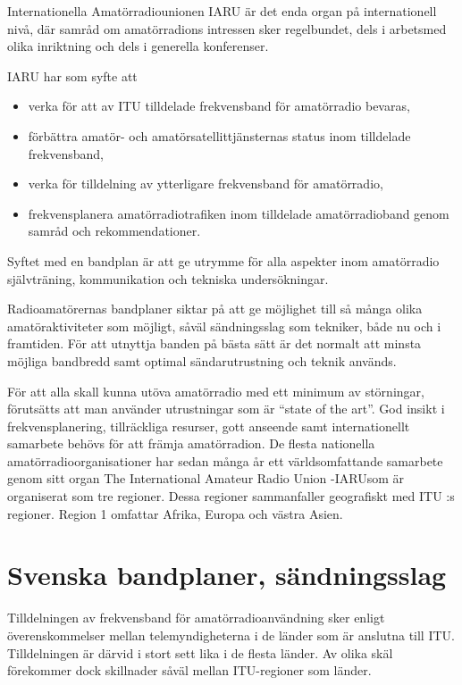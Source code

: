 Internationella Amatörradiounionen IARU är det enda organ på internationell
nivå, där samråd om amatörradions intressen sker regelbundet, dels i arbetsmed
olika inriktning och dels i generella konferenser.

IARU har som syfte att

\begin{itemize}
\item verka för att av ITU tilldelade frekvensband för amatörradio bevaras,
\item förbättra amatör- och amatörsatellittjänsternas status inom tilldelade
  frekvensband,
\item verka för tilldelning av ytterligare frekvensband för amatörradio,
\item frekvensplanera amatörradiotrafiken inom tilldelade amatörradioband genom
  samråd och rekommendationer.
\end{itemize}

Syftet med en bandplan är att ge utrymme för alla aspekter inom amatörradio
självträning, kommunikation och tekniska undersökningar.

Radioamatörernas bandplaner siktar på att ge möjlighet till så många olika
amatöraktiviteter som möjligt, såväl sändningsslag som tekniker, både nu och i
framtiden. För att utnyttja banden på bästa sätt är det normalt att minsta
möjliga bandbredd samt optimal sändarutrustning och teknik används.

För att alla skall kunna utöva amatörradio med ett minimum av störningar,
förutsätts att man använder utrustningar som är ``state of the art''.  God
insikt i frekvensplanering, tillräckliga resurser, gott anseende samt
internationellt samarbete behövs för att främja amatörradion. De flesta
nationella amatörradioorganisationer har sedan många år ett världsomfattande
samarbete genom sitt organ The International Amateur Radio Union -IARUsom är
organiserat som tre regioner. Dessa regioner sammanfaller geografiskt med ITU :s
regioner. Region 1 omfattar Afrika, Europa och västra Asien.

\section{Svenska bandplaner, sändningsslag}

Tilldelningen av frekvensband för amatörradioanvändning sker enligt
överenskommelser mellan telemyndigheterna i de länder som är anslutna till
ITU. Tilldelningen är därvid i stort sett lika i de flesta länder. Av olika skäl
förekommer dock skillnader såväl mellan ITU-regioner som länder.

